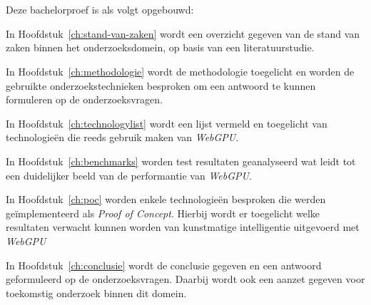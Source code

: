 \section{}%
\label{sec:opzet-bachelorproef}


Deze bachelorproef is als volgt opgebouwd:

\bigbreak{}

In Hoofdstuk~\ref{ch:stand-van-zaken} wordt een overzicht gegeven van de stand van zaken binnen het onderzoeksdomein, op basis van een literatuurstudie.

\bigbreak{}

In Hoofdstuk~\ref{ch:methodologie} wordt de methodologie toegelicht en worden de gebruikte onderzoekstechnieken besproken om een antwoord te kunnen formuleren op de onderzoeksvragen.

\bigbreak{}

In Hoofdstuk~\ref{ch:technologylist} wordt een lijst vermeld en toegelicht van technologieën die reeds gebruik maken van \textit{WebGPU}.

\bigbreak{}

In Hoofdstuk~\ref{ch:benchmarks} worden test resultaten geanalyseerd wat leidt tot een duidelijker beeld van de performantie van \textit{WebGPU}.

\bigbreak{}

In Hoofdstuk~\ref{ch:poc} worden enkele technologieën besproken die werden geïmplementeerd als \textit{Proof of Concept}. Hierbij wordt er toegelicht welke resultaten verwacht kunnen worden van kunstmatige intelligentie uitgevoerd met \textit{WebGPU}

\bigbreak{}

In Hoofdstuk~\ref{ch:conclusie} wordt de conclusie gegeven en een antwoord geformuleerd op de onderzoeksvragen. Daarbij wordt ook een aanzet gegeven voor toekomstig onderzoek binnen dit domein.